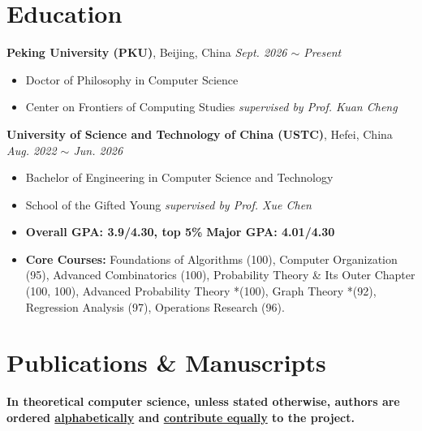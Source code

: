 \documentclass[a4paper,12pt]{ctexart}
\begin{document}
\section{\textbf{Education}}

\textbf{Peking University (PKU)}, Beijing, China \hfill \textit{Sept. 2026 $\sim$ Present}  \vspace{-0.1cm}
\begin{itemize}
    \item Doctor of Philosophy in Computer Science  \vspace{-0.25cm}
    \item Center on Frontiers of Computing Studies \hfill \textit{supervised by Prof. Kuan Cheng}
\end{itemize}

\textbf{University of Science and Technology of China (USTC)}, Hefei, China \hfill \textit{Aug. 2022 $\sim$ Jun. 2026}  \vspace{-0.1cm}
\begin{itemize}
    \item Bachelor of Engineering in Computer Science and Technology  \vspace{-0.25cm}
    \item School of the Gifted Young \hfill \textit{supervised by Prof. Xue Chen}  \vspace{-0.25cm}
    \item \textbf{Overall GPA: 3.9/4.30, top 5\%} \hfill \textbf{Major GPA: 4.01/4.30}  \vspace{-0.25cm}
    \item \textbf{Core Courses:} Foundations of Algorithms (100), Computer Organization (95), Advanced Combinatorics (100), Probability Theory \& Its Outer Chapter (100, 100), Advanced Probability Theory *(100), Graph Theory *(92), Regression Analysis (97), Operations Research (96).  \vspace{-0.25cm}
\end{itemize}



\section{\textbf{Publications \& Manuscripts}}

\textbf{In theoretical computer science, unless stated otherwise, authors are ordered \underline{alphabetically} and \underline{contribute equally} to the project.}  \vspace{-0.1cm}
\end{document}
